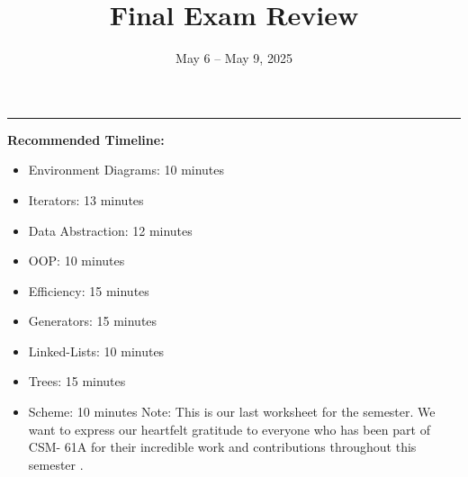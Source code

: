 \documentclass{exam}
\title{Final Exam Review}
\date{May  6 -- May 9, 2025}
\begin{document}
\maketitle\rule{\textwidth}{0.15em}

\begin{meta}

\textbf{Recommended Timeline:}
\begin{itemize}
    \item Environment Diagrams: 10 minutes
    \item Iterators: 13 minutes
    \item Data Abstraction: 12 minutes
    \item OOP: 10 minutes
    \item Efficiency: 15 minutes
    \item Generators: 15 minutes
     \item Linked-Lists: 10 minutes
     \item Trees: 15 minutes
     \item Scheme: 10 minutes
    \newline 
Note: This is our last worksheet for the semester. We want to express our heartfelt gratitude to everyone who has been part of CSM- 61A for their incredible work and contributions throughout this semester .
\end{itemize}
\end{meta}
\end{document}
